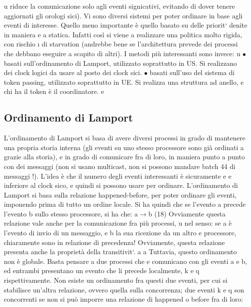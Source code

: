 u
riduce la comunicazione solo agli eventi signicativi, evitando di dover tenere
aggiornati gli orologi sici).
Vi sono diversi sistemi per poter ordinare in base agli eventi di interesse.
Quello meno importante è quello basato su delle priorit` denite in maniera
e
a
statica. Infatti così si viene a realizzare una politica molto rigida, con rischio
\i{}
di starvation (andrebbe bene se l'architettura prevede dei processi che debbano
eseguire a scapito di altri).
I metodi più interessanti sono invece:
u
$\bullet$ basati sull'ordinamento di Lamport, utilizzato soprattutto in US. Si realizzano dei clock logici da usare al
posto dei clock sici.
$\bullet$ basati sull'uso del sistema di token passing, utilizzato soprattutto in UE.
Si realizza una struttura ad anello, e chi ha il token è il coordinatore.
e
\subsection{Ordinamento di Lamport}
L'ordinamento di Lamport si basa di avere diversi processi in grado di mantenere
una propria storia interna (gli eventi su uno stesso processore sono già ordinati
a
grazie alla storia), e in grado di comunicare fra di loro, in maniera punto a
punto con dei messaggi (non si usano multicast, non si possono mandare batch
44
di messaggi !). L'idea è che il numero degli eventi interessanti è sicuramente
e
e
inferiore al clock sico, e quindi si possono usare per ordinare.
L'ordinamento di Lamport si basa sulla relazione happened-before, per poter
ordinare gli eventi, imponendo prima di tutto un ordine locale. Si ha quindi che
se l'evento a precede l'evento b sullo stesso processore, si ha che:
a$\rightarrow$b
(18)
Ovviamente questa relazione vale anche per la comunicazione fra più processi,
u
nel senso: se a è l'evento di invio di un messaggio, e b la sua ricezione da un altro
e
processore, chiaramente sono in relazione di precedenza! Ovviamente, questa
relazione presenta anche la proprietà della transitivit`.
a
a
Tuttavia, questo ordinamento non è globale. Basta pensare a due processi che
e
comunicano con gli eventi a e b, ed entrambi presentano un evento che li precede
localmente, k e q rispettivamente. Non esiste un ordinamento fra questi due
eventi, per cui si stabilisce un'altra relazione, ovvero quella sulla concorrenza;
due eventi k e q son concorrenti se non si può imporre una relazione di happened
o
before fra di loro:
